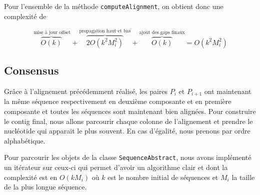 Pour l'ensemble de la méthode \verb|computeAlignment|, on obtient donc une
complexité de

\begin{equation}
	\overbrace{O(k)}^{\text{ mise à jour offset}} + \overbrace{2 O(k^{2}
	M_{i}^{2})}^{\text{propagation haut et bas}} + \overbrace{O(k)}^{\text{ajout
	des gaps finaux}} = O(k^{2} M_{i}^{2})
\end{equation}


\subsection{Consensus}
\label{subsection:consensus}

Grâce à l'alignement précédemment réalisé, les paires $P_{i}$ et $P_{i + 1}$ ont
maintenant la même séquence respectivement en deuxième composante et en première
composante et toutes les séquences sont maintenant bien alignées. Pour
construire le contig final, nous allons parcourir chaque colonne de l'alignement
et prendre le nucléotide qui apparait le plus souvent. En cas d'égalité, nous
prenons par ordre alphabétique.

Pour parcourir les objets de la classe \verb|SequenceAbstract|, nous avons
implémenté un itérateur sur ceux-ci qui permet d'avoir un algorithme clair et
dont la complexité est en $O(k M_{i})$ où $k$ est le nombre initial de
séquences et $M_{i}$ la taille de la plus longue séquence.

